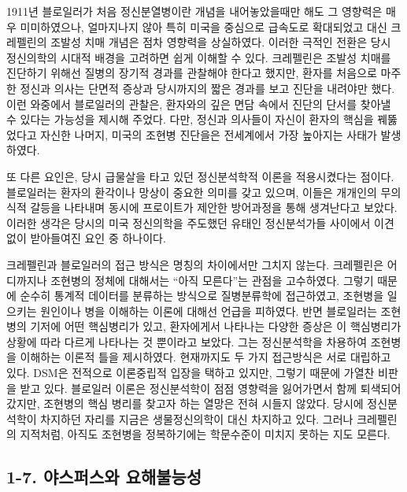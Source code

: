 \documentclass[
]{article}
\begin{document}
1911년 블로일러가 처음 정신분열병이란 개념을 내어놓았을때만 해도 그
영향력은 매우 미미하였으나, 얼마지나지 않아 특히 미국을 중심으로
급속도로 확대되었고 대신 크레펠린의 조발성 치매 개념은 점차 영향력을
상실하였다. 이러한 극적인 전환은 당시 정신의학의 시대적 배경을 고려하면
쉽게 이해할 수 있다. 크레펠린은 조발성 치매를 진단하기 위해선 질병의
장기적 경과를 관찰해야 한다고 했지만, 환자를 처음으로 마주한 정신과
의사는 단면적 증상과 당시까지의 짧은 경과를 보고 진단을 내려야만 했다.
이런 와중에서 블로일러의 관찰은, 환자와의 깊은 면담 속에서 진단의 단서를
찾아낼 수 있다는 가능성을 제시해 주었다. 다만, 정신과 의사들이 자신이
환자의 핵심을 꿰뚫었다고 자신한 나머지, 미국의 조현병 진단을은
전세계에서 가장 높아지는 사태가 발생하였다.

또 다른 요인은, 당시 급물살을 타고 있던 정신분석학적 이론을 적용시켰다는
점이다. 블로일러는 환자의 환각이나 망상이 중요한 의미를 갖고 있으며,
이들은 개개인의 무의식적 갈등을 나타내며 동시에 프로이트가 제안한
방어과정을 통해 생겨난다고 보았다. 이러한 생각은 당시의 미국 정신의학을
주도했던 유태인 정신분석가들 사이에서 이견없이 받아들여진 요인 중
하나이다.

크레펠린과 블로일러의 접근 방식은 명칭의 차이에서만 그치지 않는다.
크레펠린은 어디까지나 조현병의 정체에 대해서는 ``아직 모른다''는 관점을
고수하였다. 그렇기 때문에 순수히 통계적 데이터를 분류하는 방식으로
질병분류학에 접근하였고, 조현병을 일으키는 원인이나 병을 이해하는 이론에
대해선 언급을 피하였다. 반면 블로일러는 조현병의 기저에 어떤 핵심병리가
있고, 환자에게서 나타나는 다양한 증상은 이 핵심병리가 상황에 따라 다르게
나타나는 것 뿐이라고 보았다. 그는 정신분석학을 차용하여 조현병을
이해하는 이론적 틀을 제시하였다. 현재까지도 두 가지 접근방식은 서로
대립하고 있다. DSM은 전적으로 이론중립적 입장을 택하고 있지만, 그렇기
때문에 가열찬 비판을 받고 있다. 블로일러 이론은 정신분석학이 점점
영향력을 잃어가면서 함께 퇴색되어 갔지만, 조현병의 핵심 병리를 찾고자
하는 열망은 전혀 시들지 않았다. 당시에 정신분석학이 차지하던 자리를
지금은 생물정신의학이 대신 차지하고 있다. 그러나 크레펠린의 지적처럼,
아직도 조현병을 정복하기에는 학문수준이 미치지 못하는 지도 모른다.

\hypertarget{ununderstandability}{%
\subsection{1-7. 야스퍼스와 요해불능성}\label{ununderstandability}}
\end{document}
